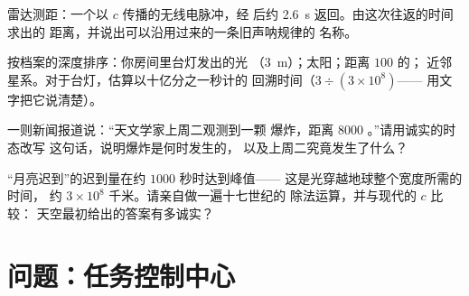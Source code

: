 \begin{exercise}[$\star\star$]\label{exo:g8:speed-of-light:9}
雷达测距：一个以 $c$ 传播的无线电脉冲，经
后约 \qty{2.6}{s} 返回。由这次往返的时间求出的
距离，并说出可以沿用过来的一条旧声呐规律的
名称。
\end{exercise}

\begin{exercise}[$\star\star$]\label{exo:g8:speed-of-light:10}
按档案的深度排序：你房间里台灯发出的光
（\qty{3}{m}）；太阳；距离 $100$ 的；
近邻星系。对于台灯，估算以十亿分之一秒计的
回溯时间（$3 \div (3 \times 10^{8})$——
用文字把它说清楚）。
\end{exercise}

\begin{exercise}[$\star\star$]\label{exo:g8:speed-of-light:11}
一则新闻报道说：“天文学家上周二观测到一颗
爆炸，距离 $8000$ 。”请用诚实的时态改写
这句话，说明爆炸是何时发生的，
以及上周二究竟发生了什么？
\end{exercise}

\begin{exercise}[$\star\star\star$]\label{exo:g8:speed-of-light:12}
“月亮迟到”的迟到量在约 $1000$ 秒时达到峰值——
这是光穿越地球整个宽度所需的时间，
约 $3 \times 10^{8}$ 千米。请亲自做一遍十七世纪的
除法运算，并与现代的 $c$ 比较：
天空最初给出的答案有多诚实？
\end{exercise}

\section{问题：任务控制中心}

